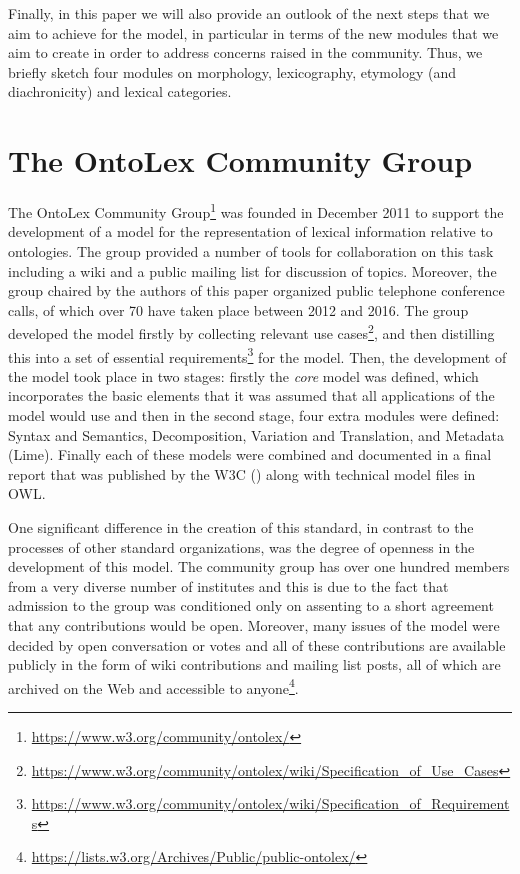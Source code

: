\documentclass[12pt,a4paper]{elex2017}
\begin{document}
Finally, in this paper we will also provide an outlook of the next steps that we
aim to achieve for the model, in particular in terms of the new modules that we
aim to create in order to address concerns raised in the community.
Thus, we briefly sketch four modules on morphology, lexicography,
etymology (and diachronicity) and lexical categories.

\section{The OntoLex Community Group}

The OntoLex Community
Group\footnote{\url{https://www.w3.org/community/ontolex/}}  was founded in
December 2011 to support the development of a model for the representation of
lexical information relative to ontologies. The group provided a number of tools
for collaboration on this task including a wiki and a public mailing list for
discussion of topics. Moreover, the group chaired by the authors of this paper
organized public telephone conference calls, of which over 70 have taken place
between 2012 and 2016. The group developed the model firstly by
collecting relevant use
cases\footnote{\url{https://www.w3.org/community/ontolex/wiki/Specification_of_Use_Cases}},
and then distilling this into a set of essential
requirements\footnote{\url{https://www.w3.org/community/ontolex/wiki/Specification_of_Requirements}}
for the model. Then, the development of the model took place in two stages:
firstly the \emph{core} model was defined, which incorporates the basic elements
that it was assumed that all applications of the model would use and then in the
second stage, four extra modules were defined: Syntax and Semantics,
Decomposition, Variation and Translation, and Metadata (Lime).
Finally each of these models were combined and documented in a final
report that was published by the W3C (\cite{cimiano2016lexicon}) along with
technical model files in OWL.

One significant difference in the creation of this standard, in contrast to the
processes of other standard organizations, was the degree of openness in the
development of this model. The community group has over one hundred members from a
very diverse number of institutes and this is due to the fact that admission to
the group was conditioned only on assenting to a short agreement that
any contributions would be open. Moreover, many issues of the model were
decided by open conversation or votes and all of these contributions are available publicly in the form of wiki
contributions and mailing list posts, all of which are archived on the Web and
accessible to
anyone\footnote{\url{https://lists.w3.org/Archives/Public/public-ontolex/}}. 
\end{document}
